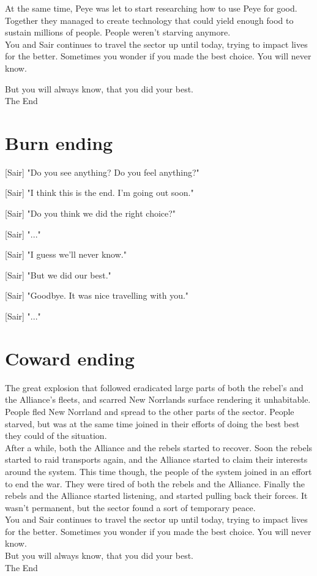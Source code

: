 \documentclass[a4paper,12pt]{article}
\begin{document}
At the same time, Peye was let to start researching how to use Peye for good. Together they managed to create
technology that could yield enough food to sustain millions of people. People weren't starving anymore.\\

You and Sair continues to travel the sector up until today, trying to impact lives for the better.
Sometimes you wonder if you made the best choice. You will never know. 

But you will always know, that you did your best.\\

The End

\section{Burn ending}

[Sair] "Do you see anything? Do you feel anything?"

[Sair] "I think this is the end. I'm going out soon."

[Sair] "Do you think we did the right choice?"

[Sair] "..."

[Sair] "I guess we'll never know."

[Sair] "But we did our best."

[Sair] "Goodbye. It was nice travelling with you."

[Sair] "..."

\section{Coward ending}

The great explosion that followed eradicated large parts of both the rebel's and the Alliance's fleets, and scarred New Norrlands
surface rendering it unhabitable. People fled New Norrland and spread to the other parts of the sector. People starved, but was at the
same time joined in their efforts of doing the best best they could of the situation.\\

After a while, both the Alliance and the rebels started to recover. Soon the rebels started to raid transports again, and the Alliance
started to claim their interests around the system. This time though, the people of the system joined in an effort to end the war.
They were tired of both the rebels and the Alliance. Finally the rebels and the Alliance started listening, and started pulling back their forces.
It wasn't permanent, but the sector found a sort of temporary peace.\\

You and Sair continues to travel the sector up until today, trying to impact lives for the better.
Sometimes you wonder if you made the best choice. You will never know.\\

But you will always know, that you did your best.\\

The End
\end{document}
